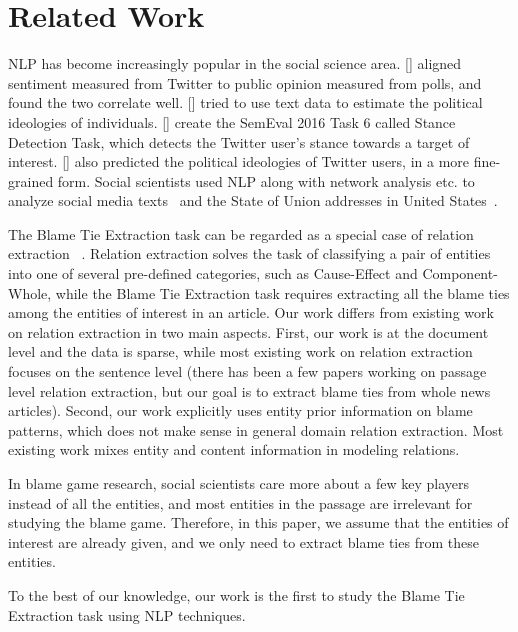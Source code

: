 \documentclass[letterpaper]{article} %
\begin{document}
\section{Related Work}
\label{task}

NLP has become increasingly popular in the social science area. \citeauthor{o2010tweets} [\citeyear{o2010tweets}] aligned sentiment measured from Twitter to public opinion measured from polls, and found the two correlate well. \citeauthor{bamman2015open} [\citeyear{bamman2015open}] tried to use text data to estimate the political ideologies of individuals. \citeauthor{mohammad-EtAl:2016:SemEval} [\citeyear{mohammad-EtAl:2016:SemEval}] create the SemEval 2016 Task 6 called Stance Detection Task, which detects the Twitter user's stance towards a target of interest. \citeauthor{preoctiuc2017beyond} [\citeyear{preoctiuc2017beyond}] also predicted the political ideologies of Twitter users, in a more fine-grained form. Social scientists used NLP along with network analysis etc. to analyze social media texts~\cite{rule2015lexical} and the State of Union addresses in United States~\cite{bail2016combining}.

The Blame Tie Extraction task can be regarded as a special case of relation extraction ~\cite{miwa2016end}. Relation extraction solves the task of classifying a pair of entities into one of several pre-defined categories, such as Cause-Effect and Component-Whole, while the Blame Tie Extraction task requires extracting all the blame ties among the entities of interest in an article. Our work differs from existing work on relation extraction in two main aspects. First, our work is at the document level and the data is sparse, while most existing work on relation extraction focuses on the sentence level (there has been a few papers working on passage level relation extraction, but our goal is to extract blame ties from whole news articles). Second, our work explicitly uses entity prior information on blame patterns, which does not make sense in general domain relation extraction. Most existing work mixes entity and content information in modeling relations.

In blame game research, social scientists care more about a few key players instead of all the entities, and most entities in the passage are irrelevant for studying the blame game. Therefore, in this paper, we assume that the entities of interest are already given, and we only need to extract blame ties from these entities.

To the best of our knowledge, our work is the first to study the Blame Tie Extraction task using NLP techniques.
\end{document}
